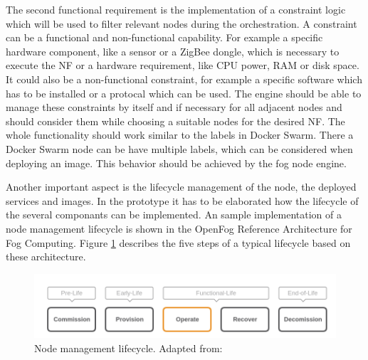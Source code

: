 The second functional requirement is the implementation of a constraint logic which will be used to filter relevant nodes during the orchestration.
A constraint can be a functional and non-functional capability.
For example a specific hardware component, like a sensor or a ZigBee dongle, which is necessary to execute the \ac{NF} or a hardware requirement, like \ac{CPU} power, \ac{RAM} or disk space.
It could also be a non-functional constraint, for example a specific software which has to be installed or a protocal which can be used.
The engine should be able to manage these constraints by itself and if necessary for all adjacent nodes and should consider them while choosing a suitable nodes for the desired \ac{NF}.
The whole functionality should work similar to the labels in Docker Swarm.
There a Docker Swarm node can be have multiple labels, which can be considered when deploying an image.
This behavior should be achieved by the fog node engine.

Another important aspect is the lifecycle management of the node, the deployed services and images.
In the prototype it has to be elaborated how the lifecycle of the several componants can be implemented.
An sample implementation of a node management lifecycle is shown in the OpenFog Reference Architecture for Fog Computing\autocite[p. 52 f.]{OpenFog:2017}.
Figure \ref{fig:open_fog_node_mgm_lifecycle} describes the five steps of a typical lifecycle based on these architecture.
\begin{figure}[H]
    \centering
    \includegraphics[width=\textwidth]{resources/images/node_management_lifecycle.png}
    \caption[Node management lifecycle]{Node management lifecycle. Adapted from: \autocite[p. 52]{OpenFog:2017}}
    \label{fig:open_fog_node_mgm_lifecycle}
\end{figure}

